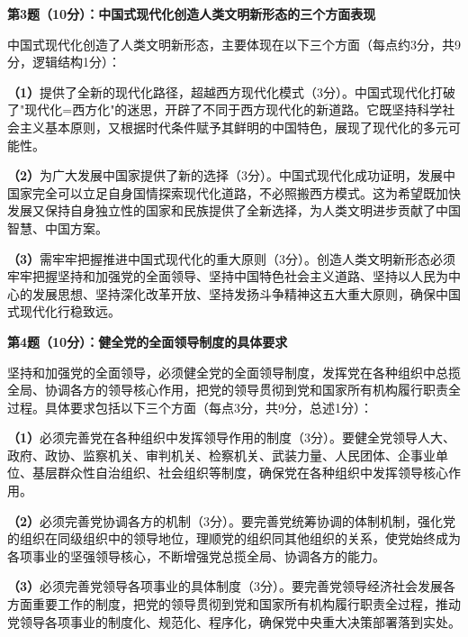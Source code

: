 \documentclass[12pt, a4paper]{article}
\begin{document}
\begin{answerbox}

\textbf{第3题（10分）：中国式现代化创造人类文明新形态的三个方面表现}

中国式现代化创造了人类文明新形态，主要体现在以下三个方面（每点约3分，共9分，逻辑结构1分）：

\textbf{（1）}提供了全新的现代化路径，超越西方现代化模式（3分）。中国式现代化打破了"现代化=西方化"的迷思，开辟了不同于西方现代化的新道路。它既坚持科学社会主义基本原则，又根据时代条件赋予其鲜明的中国特色，展现了现代化的多元可能性。

\textbf{（2）}为广大发展中国家提供了新的选择（3分）。中国式现代化成功证明，发展中国家完全可以立足自身国情探索现代化道路，不必照搬西方模式。这为希望既加快发展又保持自身独立性的国家和民族提供了全新选择，为人类文明进步贡献了中国智慧、中国方案。

\textbf{（3）}需牢牢把握推进中国式现代化的重大原则（3分）。创造人类文明新形态必须牢牢把握坚持和加强党的全面领导、坚持中国特色社会主义道路、坚持以人民为中心的发展思想、坚持深化改革开放、坚持发扬斗争精神这五大重大原则，确保中国式现代化行稳致远。

\end{answerbox}

\begin{answerbox}

\textbf{第4题（10分）：健全党的全面领导制度的具体要求}

坚持和加强党的全面领导，必须健全党的全面领导制度，发挥党在各种组织中总揽全局、协调各方的领导核心作用，把党的领导贯彻到党和国家所有机构履行职责全过程。具体要求包括以下三个方面（每点3分，共9分，总述1分）：

\textbf{（1）}必须完善党在各种组织中发挥领导作用的制度（3分）。要健全党领导人大、政府、政协、监察机关、审判机关、检察机关、武装力量、人民团体、企事业单位、基层群众性自治组织、社会组织等制度，确保党在各种组织中发挥领导核心作用。

\textbf{（2）}必须完善党协调各方的机制（3分）。要完善党统筹协调的体制机制，强化党的组织在同级组织中的领导地位，理顺党的组织同其他组织的关系，使党始终成为各项事业的坚强领导核心，不断增强党总揽全局、协调各方的能力。

\textbf{（3）}必须完善党领导各项事业的具体制度（3分）。要完善党领导经济社会发展各方面重要工作的制度，把党的领导贯彻到党和国家所有机构履行职责全过程，推动党领导各项事业的制度化、规范化、程序化，确保党中央重大决策部署落到实处。

\end{answerbox}
\end{document}
